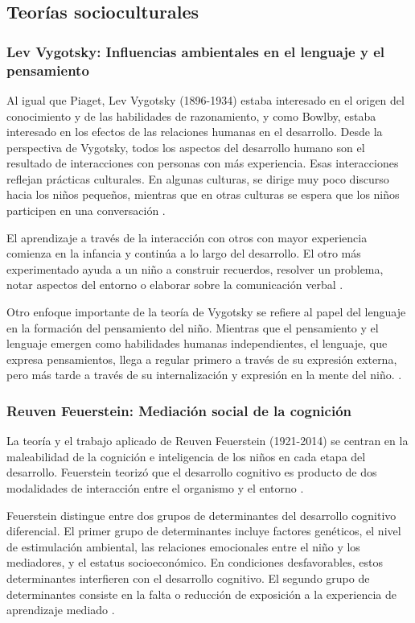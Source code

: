 \subsection{Teorías socioculturales}
\subsubsection{Lev Vygotsky: Influencias ambientales en el lenguaje y el pensamiento}
Al igual que Piaget, Lev Vygotsky (1896-1934) estaba interesado en el origen
del conocimiento y de las habilidades de razonamiento, y como Bowlby, estaba
interesado en los efectos de las relaciones humanas en el desarrollo. Desde la
perspectiva de Vygotsky, todos los aspectos del desarrollo humano son el
resultado de interacciones con personas con más experiencia. Esas interacciones
reflejan prácticas culturales. En algunas culturas, se dirige muy poco discurso
hacia los niños pequeños, mientras que en otras culturas se espera que los
niños participen en una conversación \cite{Feldman3}.

El aprendizaje a través de la interacción con otros con mayor experiencia
comienza en la infancia y continúa a lo largo del desarrollo. El otro más
experimentado ayuda a un niño a construir recuerdos, resolver un problema, notar
aspectos del entorno o elaborar sobre la comunicación verbal \cite{Feldman3}.

Otro enfoque importante de la teoría de Vygotsky se refiere al papel del
lenguaje en la formación del pensamiento del niño. Mientras que el pensamiento
y el lenguaje emergen como habilidades humanas independientes, el lenguaje, que
expresa pensamientos, llega a regular primero a través de su expresión externa,
pero más tarde a través de su internalización y expresión en la mente del niño.
\cite{Feldman3}.

\subsubsection{Reuven Feuerstein: Mediación social de la cognición}
La teoría y el trabajo aplicado de Reuven Feuerstein (1921-2014) se centran en
la maleabilidad de la cognición e inteligencia de los niños en cada etapa del
desarrollo. Feuerstein teorizó que el desarrollo cognitivo es producto de dos
modalidades de interacción entre el organismo y el entorno \cite{Feldman3}.

Feuerstein distingue entre dos grupos de determinantes del desarrollo cognitivo
diferencial. El primer grupo de determinantes incluye factores genéticos, el
nivel de estimulación ambiental, las relaciones emocionales entre el niño y los
mediadores, y el estatus socioeconómico. En condiciones desfavorables, estos
determinantes interfieren con el desarrollo cognitivo. El segundo grupo de
determinantes consiste en la falta o reducción de exposición a la experiencia de
aprendizaje mediado \cite{Feldman3}.


